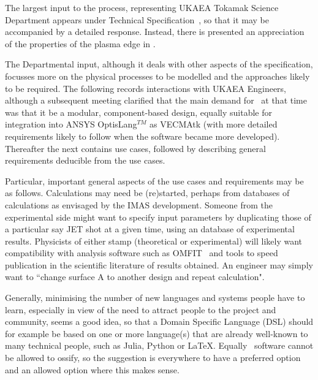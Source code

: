 
The largest input to the process, representing UKAEA Tokamak Science
Department appears under Technical Specification~, so that it may
be accompanied by a detailed response. Instead, there is presented an appreciation
of the properties of the plasma edge in .

The Departmental input, although it deals with other aspects of the specification,
focusses more on the physical processes to be modelled and the approaches likely to
be required. The following  records interactions with UKAEA Engineers, although
a subsequent meeting clarified that the main demand for \nep\ at that time was that it be a
modular, component-based design, equally suitable for integration into ANSYS OptisLang$^{TM}$
as VECMAtk (with more detailed requirements likely to follow when the software became more developed).
Thereafter the  next   contains use cases, followed by 
describing general requirements deducible from the use cases.










Particular, important general aspects of the use cases and  requirements may be
as follows.
Calculations may need be (re)started, perhaps from databases of calculations as envisaged by the 
IMAS development.  Someone from the experimental side might want to specify input parameters
by duplicating those of a particular say JET 
shot at a given time, using an database of experimental results.
Physicists of either stamp (theoretical or experimental) will likely want compatibility with
analysis software such as OMFIT~\cite{omfitwebsite} and tools to speed publication in
the scientific literature of results obtained.
An engineer may simply want to ``change surface A to another design and repeat calculation".

Generally, minimising the number of new languages and systems people have to learn, especially
in view of the need to attract people to the project and community, seems a good idea, so that
a Domain Specific Language (DSL) should for
example be based on one or more language(s) that are already well-known to many technical people,
such as Julia, Python or \LaTeX.
Equally \nep \ software cannot be allowed to ossify, so the suggestion 
is everywhere to have a preferred option and an allowed option where this makes sense.
